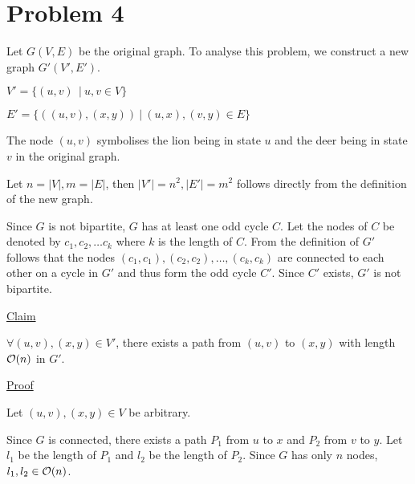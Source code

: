 \section*{Problem 4}

Let $G(V,E)$ be the original graph.
To analyse this problem, we construct a new graph $G'(V', E')$. 

$V' = \{(u,v)\ ~ | ~ u, v \in V\}$

$E' = \{((u,v), (x,y)) ~|~ (u, x), (v, y) \in E\}$

The node $(u,v)$ symbolises the lion being in state $u$ and the deer being in state $v$ in the original graph.

Let $n = |V|, m = |E|$, then $|V'| = n^2, |E'| = m^2$ follows directly from the definition of the new graph.

Since $G$ is not bipartite, $G$ has at least one odd cycle $C$. Let the nodes of $C$ be denoted by $c_1, c_2, \dots c_k$ where $k$ is the length of $C$. From the definition of $G'$ follows that the nodes $(c_1,c_1), (c_2,c_2),\dots,(c_k,c_k)$ are connected to each other on a cycle in $G'$ and thus form the odd cycle $C'$.
Since $C'$ exists, $G'$ is not bipartite.

\underline{Claim}

$\forall (u,v), (x,y) \in V'$, there exists a path from $(u, v)$ to $(x, y)$ with length $\mathcal{O}(n)$ in $G'$.

\underline{Proof}

Let $(u,v), (x,y) \in V$ be arbitrary.

Since $G$ is connected, there exists a path $P_1$ from $u$ to $x$ and $P_2$ from $v$ to $y$.
Let $l_1$ be the length of $P_1$ and $l_2$ be the length of $P_2$.
Since $G$ has only $n$ nodes, $l_1, l_2 \in \mathcal{O}(n)$.


